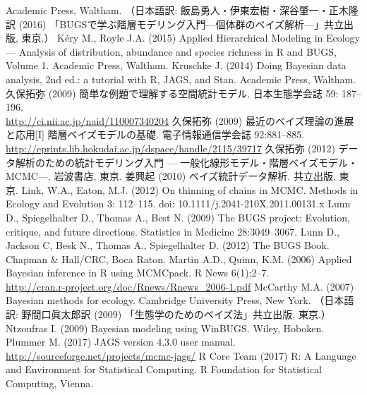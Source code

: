 \documentclass[11pt,uplatex]{jsarticle}
\begin{document}
\begin{thebibliography}{99}
  Academic Press, Waltham.
    （日本語訳: 飯島勇人・伊東宏樹・深谷肇一・正木隆訳 (2016) 「BUGSで学ぶ階層モデリング入門---個体群のベイズ解析---」共立出版, 東京.）
 K\'ery M., Royle J.A. (2015) Applied Hierarchical Modeling in Ecology --- Analysis of distribution, abundance and species richness in R and BUGS, Volume 1. Academic Press, Waltham.
 Kruschke J. (2014) Doing Bayesian data analysis, 2nd ed.:
  a tutorial with R, JAGS, and Stan. Academic Press, Waltham.
 久保拓弥 (2009) 簡単な例題で理解する空間統計モデル. 
  日本生態学会誌 59: 187--196. \\
  \url{http://ci.nii.ac.jp/naid/110007340204}
 久保拓弥 (2009) 最近のベイズ理論の進展と応用[I]
  階層ベイズモデルの基礎. 電子情報通信学会誌 92:881--885.\\
  \url{http://eprints.lib.hokudai.ac.jp/dspace/handle/2115/39717}
 久保拓弥 (2012) データ解析のための統計モデリング入門 ---
   一般化線形モデル・階層ベイズモデル・MCMC---. 岩波書店, 東京.
 姜興起 (2010) ベイズ統計データ解析. 共立出版, 東京.
 Link, W.A., Eaton, M.J. (2012) On thinning of chains in MCMC.
Methods in Ecology and Evolution 3: 112--115. doi: 10.1111/j.2041-210X.2011.00131.x
 Lunn D., Spiegelhalter D., Thomas A., Best N. (2009)
  {The BUGS project: Evolution, critique, and future directions}.
  {Statistics in Medicine} {28}:3049--3067.
 Lunn D., Jackson C, Besk N., Thomas A., Spiegelhalter D.
  (2012) The {BUGS} Book. Chapman \& Hall/CRC, Boca Raton.
 Martin A.D., Quinn, K.M. (2006) Applied Bayesian inference in R
using MCMCpack. R News 6(1):2--7. \\
    \url{http://cran.r-project.org/doc/Rnews/Rnews_2006-1.pdf}
 McCarthy M.A. (2007) Bayesian methods for ecology.
  Cambridge University Press, New York.
  （日本語訳: 野間口眞太郎訳 (2009) 「生態学のためのベイズ法」共立出版, 東京.）
 Ntzoufras I. (2009) Bayesian modeling using WinBUGS.
  Wiley, Hoboken.
 Plummer M. (2017) JAGS version 4.3.0 user manual.\\
  \url{http://sourceforge.net/projects/mcmc-jags/}
 R Core Team (2017)
   R: A Language and Environment for Statistical Computing.
   R Foundation for Statistical Computing, Vienna.\\

\end{thebibliography}
\end{document}
